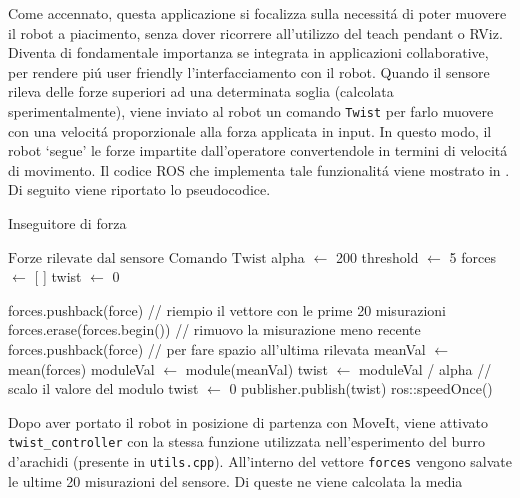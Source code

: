 Come accennato, questa applicazione si focalizza sulla necessit\'{a} di poter muovere il robot a piacimento, senza dover 
ricorrere all'utilizzo del teach pendant o RViz\footnotemark{}. 
Diventa di fondamentale importanza se integrata in applicazioni collaborative, per rendere pi\'{u} user friendly l'interfacciamento 
con il robot. 
Quando il sensore rileva delle forze superiori ad una determinata soglia (calcolata sperimentalmente), viene inviato al robot un 
comando \verb|Twist| per farlo muovere con una velocit\'{a} proporzionale alla forza applicata in input. In questo modo, il robot `segue' 
le forze impartite dall'operatore convertendole in termini di velocit\'{a} di movimento. 
Il codice ROS che implementa tale funzionalit\'{a} viene mostrato in \cite{force_follower}. 
Di seguito viene riportato lo pseudocodice. 
\begin{algorithm}[H]
\caption{Inseguitore di forza}\label{algo:force_follower}
\begin{algorithmic}[1]
    \Require $\text{Forze rilevate dal sensore}$
    \Ensure $\text{Comando Twist}$
    \State alpha $\gets$ 200
    \State threshold $\gets$ 5
    \State forces $\gets$ [ ]
    \State twist $\gets$ 0
    
        \State forces.pushback(force) // riempio il vettore con le prime 20 misurazioni
    \Else
        \State forces.erase(forces.begin()) // rimuovo la misurazione meno recente
        \State forces.pushback(force) // per fare spazio all'ultima rilevata
        \State meanVal $\gets$ mean(forces)
        \State moduleVal $\gets$ module(meanVal) 
            \State twist $\gets$ moduleVal / alpha // scalo il valore del modulo
        \Else
            \State twist $\gets$ 0
        \EndIf
        \State publisher.publish(twist)
    \EndIf
    \State ros::speedOnce()
    \EndWhile
\end{algorithmic}
\end{algorithm}
Dopo aver portato il robot in posizione di partenza con MoveIt, viene attivato \verb|twist_controller| con la stessa funzione 
utilizzata nell'esperimento del burro d'arachidi (presente in \verb|utils.cpp|).  
All'interno del vettore \verb|forces| vengono salvate le ultime 20 misurazioni del sensore. Di queste ne viene calcolata la media 
